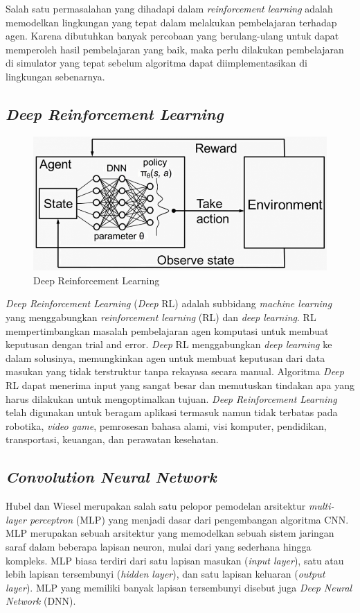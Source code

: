 Salah satu permasalahan yang dihadapi dalam \textit{reinforcement learning }adalah memodelkan lingkungan yang tepat dalam melakukan pembelajaran terhadap agen. Karena dibutuhkan banyak percobaan yang berulang-ulang untuk dapat memperoleh hasil pembelajaran yang baik, maka perlu dilakukan pembelajaran di simulator yang tepat sebelum algoritma dapat diimplementasikan di lingkungan sebenarnya.

\subsection{\textit{Deep Reinforcement Learning}}
\begin{figure}[H] 
	\centering
	\includegraphics[width=.4\linewidth]{images/deep_rl}
	\caption{Deep Reinforcement Learning}
	\label{fig:deep_reinforcement_learning}
\end{figure}
\textit{Deep Reinforcement Learning }(\textit{Deep }RL) adalah subbidang \textit{machine learning }yang menggabungkan \textit{reinforcement learning }(RL) dan \textit{deep learning}. RL mempertimbangkan masalah pembelajaran agen komputasi untuk membuat keputusan dengan trial and error. \textit{Deep }RL menggabungkan \textit{deep learning }ke dalam solusinya, memungkinkan agen untuk membuat keputusan dari data masukan yang tidak terstruktur tanpa rekayasa secara manual. Algoritma \textit{Deep }RL dapat menerima input yang sangat besar dan memutuskan tindakan apa yang harus dilakukan untuk mengoptimalkan tujuan. \textit{Deep Reinforcement Learning }telah digunakan untuk beragam aplikasi termasuk namun tidak terbatas pada robotika, \textit{video game}, pemrosesan bahasa alami, visi komputer, pendidikan, transportasi, keuangan, dan perawatan kesehatan.\cite{cit:intro_to_deeprl}

\subsection{\textit{Convolution Neural Network}}
Hubel dan Wiesel merupakan salah satu pelopor pemodelan arsitektur \textit{multi-layer perceptron }(MLP) yang menjadi dasar dari pengembangan algoritma CNN. MLP merupakan sebuah arsitektur yang memodelkan sebuah sistem jaringan saraf dalam beberapa lapisan neuron, mulai dari yang sederhana hingga kompleks. MLP biasa terdiri dari satu lapisan masukan (\textit{input layer}), satu atau lebih lapisan tersembunyi (\textit{hidden layer}), dan satu lapisan keluaran (\textit{output layer}). MLP yang memiliki banyak lapisan tersembunyi disebut juga \textit{Deep Neural Network }(DNN).

